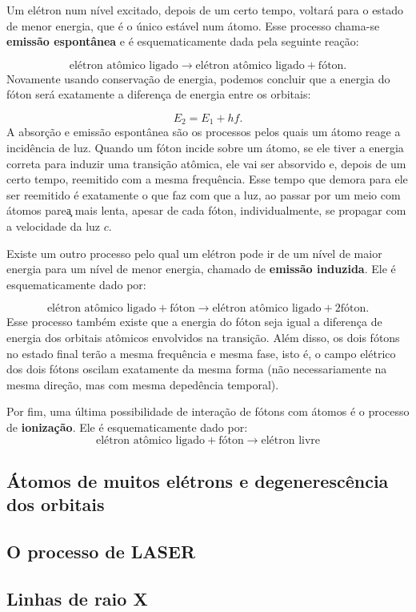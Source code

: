 \documentclass{article}
\begin{document}
Um el\'etron num n\'ivel excitado, depois de um certo tempo, voltar\'a para o estado de menor energia, que \'e o \'unico est\'avel num \'atomo. Esse processo chama-se \textbf{emiss\~ao espont\^anea} e \'e esquematicamente dada pela seguinte rea\c c\~ao:


\begin{equation}
\text{el\'etron at\^omico ligado} \rightarrow \text{el\'etron at\^omico ligado} + \text{f\'oton}.
\end{equation}
Novamente usando conserva\c c\~ao de energia, podemos concluir que a energia do f\'oton ser\'a exatamente a diferen\c ca de energia entre os orbitais:

\begin{equation}
E_2 = E_1 + hf.
\end{equation}
A absor\c c\~ao e emiss\~ao espont\^anea s\~ao os processos pelos quais um \'atomo reage a incid\^encia de luz. Quando um f\'oton incide sobre um \'atomo, se ele tiver a energia correta para induzir uma transi\c c\~ao at\^omica, ele vai ser absorvido e, depois de um certo tempo, reemitido com a mesma frequ\^encia. Esse tempo que demora para ele ser reemitido \'e exatamente o que faz com que a luz, ao passar por um meio com \'atomos pare\c a mais lenta, apesar de cada f\'oton, individualmente, se propagar com a velocidade da luz $c$.

Existe um outro processo pelo qual um el\'etron pode ir de um n\'ivel de maior energia para um n\'ivel de menor energia, chamado de \textbf{emiss\~ao induzida}. Ele \'e esquematicamente dado por:

\begin{equation}
\text{el\'etron at\^omico ligado} + \text{f\'oton} \rightarrow \text{el\'etron at\^omico ligado} + 2\text{f\'oton}.
\end{equation}
Esse processo tamb\'em existe que a energia do f\'oton seja igual a diferen\c ca de energia dos orbitais at\^omicos envolvidos na transi\c c\~ao. Al\'em disso, os dois f\'otons no estado final ter\~ao a mesma frequ\^encia e mesma fase, isto \'e, o campo el\'etrico dos dois f\'otons oscilam exatamente da mesma forma (n\~ao necessariamente na mesma dire\c c\~ao, mas com mesma deped\^encia temporal).

Por fim, uma \'ultima possibilidade de intera\c c\~ao de f\'otons com \'atomos \'e o processo de \textbf{ioniza\c c\~ao}. Ele \'e esquematicamente dado por:
\begin{equation}
\text{el\'etron at\^omico ligado} + \text{f\'oton} \rightarrow \text{el\'etron livre}
\end{equation}


\subsection{\'Atomos de muitos el\'etrons e degeneresc\^encia dos orbitais}
\subsection{O processo de LASER}
\subsection{Linhas de raio X}
\end{document}
